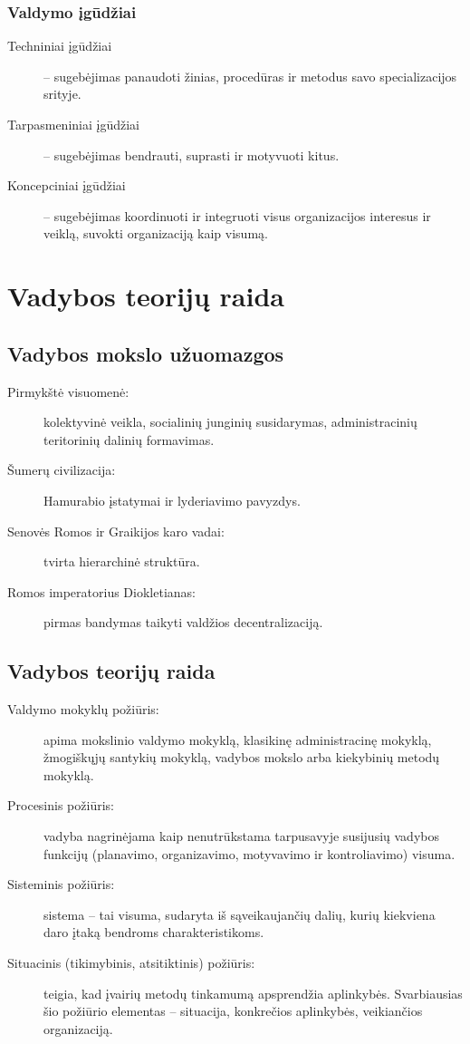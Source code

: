 \subsection{Valdymo įgūdžiai}

\begin{description}
  \item[Techniniai įgūdžiai] – sugebėjimas panaudoti žinias, procedūras
    ir metodus savo specializacijos srityje.
  \item[Tarpasmeniniai įgūdžiai] – sugebėjimas bendrauti, suprasti
    ir motyvuoti kitus.
  \item[Koncepciniai įgūdžiai] – sugebėjimas koordinuoti ir integruoti
    visus organizacijos interesus ir veiklą, suvokti organizaciją
    kaip visumą.
\end{description}

\chapter{Vadybos teorijų raida}

\section{Vadybos mokslo užuomazgos}

\begin{description}
  \item[Pirmykštė visuomenė:] kolektyvinė veikla, socialinių junginių
    susidarymas, administracinių teritorinių dalinių formavimas.
  \item[Šumerų civilizacija:] Hamurabio įstatymai ir lyderiavimo
    pavyzdys.
  \item[Senovės Romos ir Graikijos karo vadai:] tvirta hierarchinė
    struktūra.
  \item[Romos imperatorius Diokletianas:] pirmas bandymas taikyti
    valdžios decentralizaciją.
\end{description}

\section{Vadybos teorijų raida}

\begin{description}
  \item[Valdymo mokyklų požiūris:] apima mokslinio valdymo mokyklą, 
    klasikinę administracinę mokyklą, žmogiškųjų santykių mokyklą,
    vadybos mokslo arba kiekybinių metodų mokyklą.
  \item[Procesinis požiūris:] vadyba nagrinėjama kaip nenutrūkstama
    tarpusavyje susijusių vadybos funkcijų (planavimo, organizavimo,
    motyvavimo ir kontroliavimo) visuma.
  \item[Sisteminis požiūris:] sistema – tai visuma, sudaryta iš
    sąveikaujančių dalių, kurių kiekviena daro įtaką bendroms
    charakteristikoms.
  \item[Situacinis (tikimybinis, atsitiktinis) požiūris:] teigia,
    kad įvairių metodų tinkamumą apsprendžia aplinkybės. Svarbiausias
    šio požiūrio elementas – situacija, konkrečios aplinkybės,
    veikiančios organizaciją.
\end{description}


